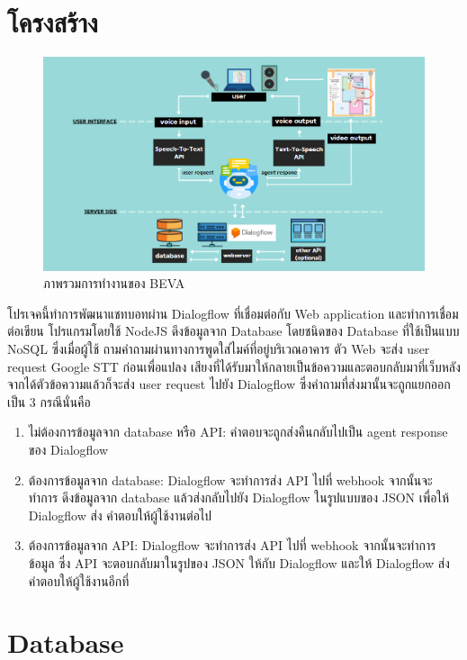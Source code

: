 \section{โครงสร้าง}
\begin{figure}[hbt!]
  \begin{center}
    \includegraphics[width=\textwidth,keepaspectratio]{pic/overview.png}
  \end{center}
  \caption{ภาพรวมการทำงานของ BEVA}
  \label{fig:overview}
\end{figure}
โปรเจคนี้ทำการพัฒนาแชทบอทผ่าน Dialogflow ที่เชื่อมต่อกับ Web application และทำการเชื่อมต่อเขียน
โปรแกรมโดยใช้ NodeJS ดึงข้อมูลจาก Database โดยชนิดของ Database ที่ใช้เป็นแบบ NoSQL ซึ่งเมื่อผู้ใช้
ถามคำถามผ่านทางการพูดใส่ไมค์ที่อยู่บริเวณอาคาร ตัว Web จะส่ง user request Google STT ก่อนเพื่อแปลง
เสียงที่ได้รับมาให้กลายเป็นข้อความและตอบกลับมาที่เว็บหลังจากได้ตัวข้อความแล้วก็จะส่ง user request ไปยัง
Dialogflow ซึ่งคำถามที่ส่งมานั้นจะถูกแยกออกเป็น 3 กรณีนั่นคือ

\begin{enumerate}
  \item ไม่ต้องการข้อมูลจาก database หรือ API: คำตอบจะถูกส่งคืนกลับไปเป็น agent response
        ของ Dialogflow
  \item ต้องการข้อมูลจาก database: Dialogflow จะทำการส่ง API ไปที่ webhook จากนั้นจะทำการ
        ดึงข้อมูลจาก database แล้วส่งกลับไปยัง Dialogflow ในรูปแบบของ JSON เพื่อให้ Dialogflow ส่ง
        คำตอบให้ผู้ใช้งานต่อไป
  \item ต้องการข้อมูลจาก API: Dialogflow จะทำการส่ง API ไปที่ webhook จากนั้นจะทำการข้อมูล
        ซึ่ง API จะตอบกลับมาในรูปของ JSON ให้กับ Dialogflow และให้ Dialogflow ส่งคำตอบให้ผู้ใช้งานอีกที่
\end{enumerate}
\section{Database}
